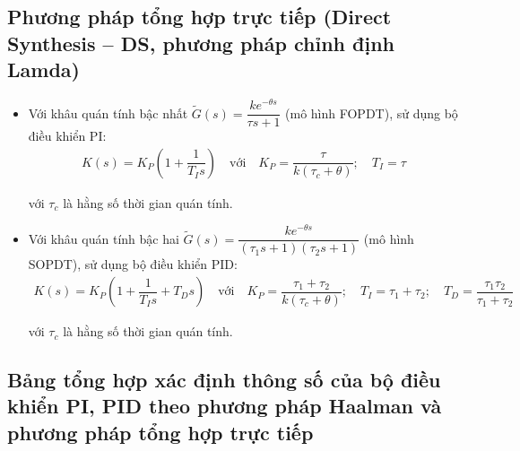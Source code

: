 \subsection{Phương pháp tổng hợp trực tiếp (Direct Synthesis -- DS, phương pháp chỉnh định Lamda)}
    \begin{itemize}
        \item Với khâu quán tính bậc nhất $\tilde{G}(s) = \dfrac{k e^{-\theta s}}{\tau s + 1}$ (mô hình FOPDT), sử dụng bộ điều khiển PI:
        \begin{align*}
            K(s) = K_P \left({1 + \dfrac{1}{T_I s}}\right) \quad \textrm{với} \quad K_P = \dfrac{\tau}{k\left({\tau_c + \theta}\right)}; \quad T_I = \tau
        \end{align*}

        với $\tau_c$ là hằng số thời gian quán tính.

        \item Với khâu quán tính bậc hai $\tilde{G}(s) = \dfrac{k e^{-\theta s}}{\left({\tau_1 s + 1}\right) \left({\tau_2 s + 1}\right)}$ (mô hình SOPDT), sử dụng bộ điều khiển PID:
            \begin{align*}
                K(s) = K_P \left({1 + \dfrac{1}{T_I s} + T_D s}\right) \quad \textrm{với} \quad K_P = \dfrac{\tau_1 + \tau_2}{k\left({\tau_c + \theta}\right)}; \quad T_I = \tau_1 + \tau_2; \quad T_D = \dfrac{\tau_1 \tau_2}{\tau_1 + \tau_2}
            \end{align*}

        với $\tau_c$ là hằng số thời gian quán tính.
    \end{itemize}

\subsection{Bảng tổng hợp xác định thông số của bộ điều khiển PI, PID theo phương pháp Haalman và phương pháp tổng hợp trực tiếp}

